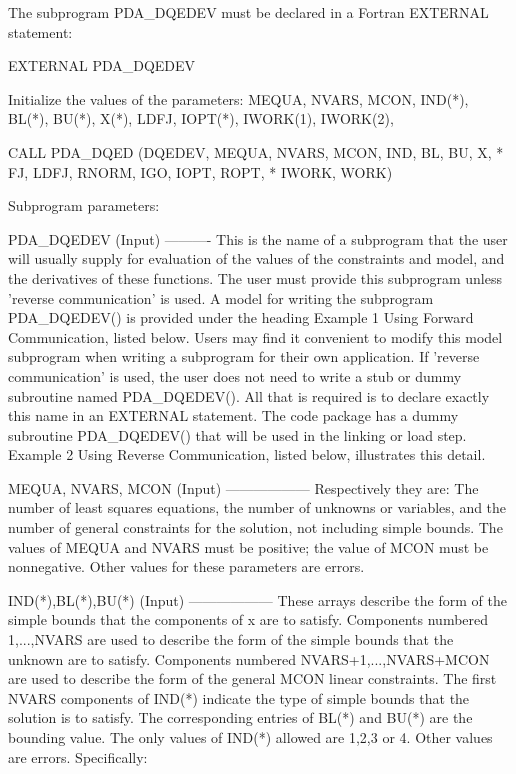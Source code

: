 \documentclass[11pt,twoside,nolof]{starlink}
\begin{document}
\begin{terminalv}
  The  subprogram  PDA_DQEDEV  must  be declared in a Fortran EXTERNAL
  statement:

        EXTERNAL PDA_DQEDEV

  Initialize the values of the parameters:
        MEQUA, NVARS, MCON, IND(*), BL(*), BU(*), X(*), LDFJ,
        IOPT(*), IWORK(1), IWORK(2),

        CALL PDA_DQED  (DQEDEV, MEQUA, NVARS, MCON, IND, BL, BU, X,
       *                FJ, LDFJ, RNORM, IGO, IOPT, ROPT,
       *                IWORK, WORK)

  Subprogram parameters:

  PDA_DQEDEV (Input)
  ----------
  This  is  the  name  of  a subprogram that the user will usually
  supply  for  evaluation  of  the  values  of the constraints and
  model,  and  the  derivatives  of these functions. The user must
  provide  this subprogram unless 'reverse communication' is used.
  A  model  for  writing the subprogram PDA_DQEDEV() is provided under
  the heading Example 1 Using Forward Communication, listed below.
  Users  may  find  it  convenient to modify this model subprogram
  when  writing  a  subprogram  for  their  own  application.   If
  'reverse communication' is used, the user does not need to write
  a stub or dummy subroutine named PDA_DQEDEV().  All that is required
  is  to  declare exactly this name in an EXTERNAL statement.  The
  code  package  has a dummy subroutine PDA_DQEDEV() that will be used
  in   the   linking  or  load  step.   Example  2  Using  Reverse
  Communication, listed below, illustrates this detail.

  MEQUA, NVARS, MCON (Input)
  ------------------
  Respectively  they  are:  The number of least squares equations,
  the  number  of unknowns or variables, and the number of general
  constraints  for the solution, not including simple bounds.  The
  values  of  MEQUA  and NVARS must be positive; the value of MCON
  must  be  nonnegative.   Other  values  for these parameters are
  errors.

  IND(*),BL(*),BU(*) (Input)
  ------------------
  These  arrays  describe  the  form of the simple bounds that the
  components of x are to satisfy.  Components numbered 1,...,NVARS
  are  used  to  describe  the  form of the simple bounds that the
  unknown     are     to     satisfy.      Components     numbered
  NVARS+1,...,NVARS+MCON  are  used  to  describe  the form of the
  general  MCON linear constraints.  The first NVARS components of
  IND(*)  indicate  the type of simple bounds that the solution is
  to  satisfy.   The  corresponding entries of BL(*) and BU(*) are
  the bounding value.  The only values of IND(*) allowed are 1,2,3
  or 4.  Other values are errors.  Specifically:


\end{terminalv}
\end{document}
